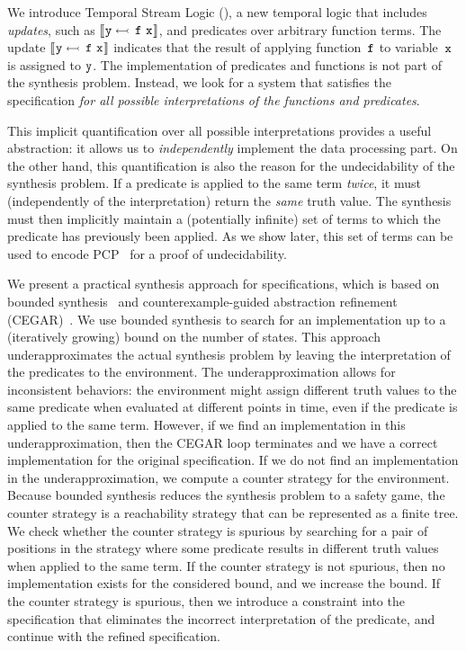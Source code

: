 We introduce Temporal Stream Logic (\TSL), a new temporal logic that includes
\emph{updates}, such as $\llbracket \hspace{0.5pt} {\text{\texttt{y}}} \leftarrowtail \, {\text{\texttt{f}}}~{\text{\texttt{x}}} \hspace{0.5pt} \rrbracket$, and
predicates over arbitrary function terms. The update $\llbracket \hspace{0.5pt} {\text{\texttt{y}}} \leftarrowtail \, {\text{\texttt{f}}}~{\text{\texttt{x}}} \hspace{0.5pt} \rrbracket$ indicates
that the result of applying function~$ {\text{\texttt{f}}} $ to variable~$ {\text{\texttt{x}}} $ is assigned
to ${\text{\texttt{y}}}$. The implementation of predicates and functions is
not part of the synthesis problem. Instead, we look for a
system that satisfies the \TSL specification \emph{for all
possible interpretations of the functions and predicates}.

This implicit quantification over all possible interpretations provides a useful
abstraction: it allows us to \emph{independently} implement the data
processing part. On the other hand, this quantification is also the
reason for the undecidability of the synthesis problem. If a predicate
is applied to the same term \emph{twice}, it must (independently of the interpretation)
return the \emph{same} truth value. The synthesis must then implicitly
maintain a (potentially infinite) set of terms to which the predicate
has previously been applied. As we show later, this set of terms can
be used to encode PCP~\cite{post1946} for a proof of undecidability.

We present a practical synthesis approach for \TSL specifications, which is based
on bounded synthesis~\cite{Schewe:2013} and counterexample-guided abstraction refinement (CEGAR)~\cite{DBLP:journals/jacm/ClarkeGJLV03}.
We use bounded synthesis to search for an implementation up to a (iteratively growing)
bound on the number of states. This approach underapproximates the actual \TSL synthesis
problem by leaving the interpretation of the predicates to the environment.
The underapproximation allows for inconsistent behaviors: the environment might assign different
truth values to the same predicate when evaluated at different points in time,
even if the predicate is applied to the same term.
However, if we find an implementation in this underapproximation, then the CEGAR loop terminates and we have a correct implementation for the original \TSL specification. If we do not find an implementation in the underapproximation,
we compute a counter strategy for the environment. Because bounded synthesis reduces the synthesis problem to a safety game, the counter strategy is a reachability strategy that can be represented as a finite tree. We check whether the counter strategy is spurious by searching for a pair of positions in the strategy where some predicate results in different truth values when applied to the same term.
If the counter strategy is not spurious, then no implementation exists for the considered bound, and we increase the bound.
If the counter strategy is spurious, then we introduce a constraint
into the specification that eliminates the incorrect interpretation
of the predicate, and continue with the refined specification.

